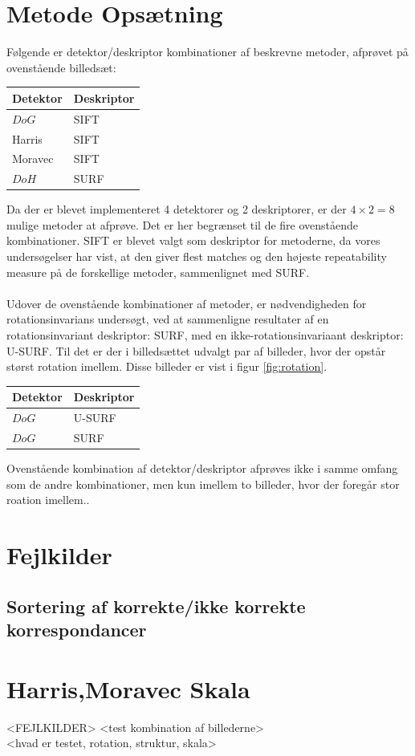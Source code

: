 \section{Metode Opsætning}
Følgende er detektor/deskriptor kombinationer af beskrevne metoder, afprøvet på ovenstående billedsæt:
\begin{center}
    \begin{tabular}{ | l | l |}
    \hline
    Detektor & Deskriptor \\ \hline
    $DoG$ & SIFT  \\ \hline       
    Harris & SIFT \\ \hline    
    Moravec & SIFT \\ \hline    
    $DoH$ & SURF\\ \hline    
    \end{tabular}
\end{center}
Da der er blevet implementeret 4 detektorer og 2 deskriptorer, er der $4\times 2=8$ mulige metoder at afprøve. Det er her begrænset til de fire ovenstående kombinationer. SIFT er blevet valgt som deskriptor for metoderne, da vores undersøgelser har vist, at den giver flest matches og den højeste repeatability measure på de forskellige metoder, sammenlignet med SURF. 
\\ \\ 
Udover de ovenstående kombinationer af metoder, er nødvendigheden for rotationsinvarians undersøgt, ved at sammenligne resultater af en rotationsinvariant deskriptor: SURF, med en ikke-rotationsinvariaant deskriptor: U-SURF. Til det er der i billedsættet udvalgt par af billeder, hvor der opstår størst rotation imellem. Disse billeder er vist i figur \ref{fig:rotation}.
\begin{center}
    \begin{tabular}{ | l | l |}
    \hline
    Detektor & Deskriptor \\ \hline
    $DoG$ & U-SURF \\ \hline       
    $DoG$ & SURF \\ \hline     
    \end{tabular}
\end{center}
Ovenstående kombination af detektor/deskriptor afprøves ikke i samme omfang som de andre kombinationer, men kun imellem to billeder, hvor der foregår stor roation imellem..
\section{Fejlkilder}
\subsection{Sortering af korrekte/ikke korrekte korrespondancer}
\section{Harris,Moravec Skala}
<FEJLKILDER>
<test kombination af billederne> \\
<hvad er testet, rotation, struktur, skala>